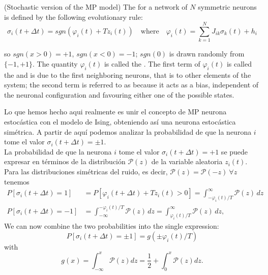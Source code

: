 \begin{definicion}(Stochastic version of the MP model)
    The  for a network of $N$ symmetric neurons is defined by the following evolutionary rule:
    \begin{equation*}
        \sigma_i (t + \Delta t) = sgn\left( \varphi_i (t) + T z_i (t) \right) \quad \text{where} \quad \varphi_i (t) = \sum_{k=1}^{N} J_{ik} \sigma_k (t) + h_i
    \end{equation*}

    \noindent
    so $sgn(x > 0) = +1$, $sgn(x < 0) = -1$; $sgn(0)$ is drawn randomly from $\{-1, +1\}$. The quantity $\varphi_i (t)$ is called the . The first term of $\varphi_i (t)$ is called the  and is due to the first neighboring neurons, that is to other elements of the system; the second term is referred to as  because it acts as a bias, independent of the neuronal configuration and favouring either one of the possible states. \\
\end{definicion}

\noindent
Lo que hemos hecho aqui realmente es unir el concepto de MP neurona estocástica con el modelo de Ising, obteniendo así una neurona estocástica simétrica. A partir de aquí podemos analizar la probabilidad de que la neurona $i$ tome el valor $\sigma_i (t + \Delta t) = \pm 1$.\\

\noindent
La probabilidad de que la neurona $i$ tome el valor $\sigma_i (t + \Delta t) = +1$ se puede expresar en términos de la distribución $\mathcal{P}(z)$ de la variable aleatoria $z_i(t)$. Para las distribuciones simétricas del ruido, es decir, $\mathcal{P}(z)=\mathcal{P}(-z) \ \forall z$ tenemos
\begin{align*}
    P[\sigma_i (t + \Delta t) = 1] &= P[\varphi_i(t + \Delta t) + T z_i(t) > 0] = \int_{-\varphi_i (t)/T}^{\infty} \mathcal{P}(z) \, dz \\
    P[\sigma_i (t + \Delta t) = -1] &= \int_{-\infty}^{-\varphi_i (t)/T} \mathcal{P}(z) \, dz = \int_{\varphi_i (t)/T}^{\infty} \mathcal{P}(z) \, dz,
\end{align*}
\noindent
We can now combine the two probabilities into the single expression:
\begin{equation*}
    P[\sigma_i(t + \Delta t) = \pm 1] = g(\pm \varphi_i (t)/T )
\end{equation*}
with
\begin{equation*}
    g(x) = \int_{-\infty}^{x} \mathcal{P}(z) dz = \dfrac{1}{2}+ \int_{0}^{x} \mathcal{P}(z) dz.
\end{equation*}

